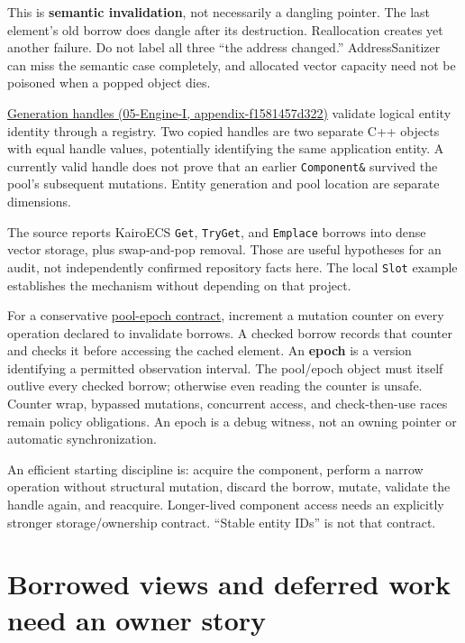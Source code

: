This is \textbf{semantic invalidation}, not necessarily a dangling pointer. The last element's old borrow does dangle after its destruction. Reallocation creates yet another failure. Do not label all three ``the address changed.'' AddressSanitizer can miss the semantic case completely, and allocated vector capacity need not be poisoned when a popped object dies.

\href{../05-Engine-I/main.pdf\#nameddest=appendix-f1581457d322}{Generation handles (05-Engine-I, appendix-f1581457d322)} validate logical entity identity through a registry. Two copied handles are two separate C++ objects with equal handle values, potentially identifying the same application entity. A currently valid handle does not prove that an earlier \texttt{Component\&} survived the pool's subsequent mutations. Entity generation and pool location are separate dimensions.

The source reports KairoECS \texttt{Get}, \texttt{TryGet}, and \texttt{Emplace} borrows into dense vector storage, plus swap-and-pop removal. Those are useful hypotheses for an audit, not independently confirmed repository facts here. The local \texttt{Slot} example establishes the mechanism without depending on that project.

For a conservative \hyperref[appendix-aa405b7c3903]{pool-epoch contract}, increment a mutation counter on every operation declared to invalidate borrows. A checked borrow records that counter and checks it before accessing the cached element. An \textbf{epoch} is a version identifying a permitted observation interval. The pool/epoch object must itself outlive every checked borrow; otherwise even reading the counter is unsafe. Counter wrap, bypassed mutations, concurrent access, and check-then-use races remain policy obligations. An epoch is a debug witness, not an owning pointer or automatic synchronization.

An efficient starting discipline is: acquire the component, perform a narrow operation without structural mutation, discard the borrow, mutate, validate the handle again, and reacquire. Longer-lived component access needs an explicitly stronger storage/ownership contract. ``Stable entity IDs'' is not that contract.

\section{Borrowed views and deferred work need an owner story}\label{01-foundations-i-ch003-borrowed-views-and-deferred-work-need-an-owner-story}


